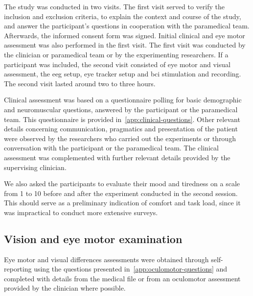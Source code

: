 \documentclass{article}
\begin{document}
The study was conducted in two visits.
The first visit served to verify the inclusion and
exclusion criteria, to explain the context and course of the study, and answer
the participant's questions in cooperation with the paramedical team.
Afterwards, the informed consent form was signed.
Initial clinical and eye motor assessment was also performed in the first visit.
The first visit was conducted by the clinician or paramedical team or by the
experimenting researchers.
If a participant was included, the second visit consisted of  eye motor and
visual assessment, the \ac{eeg} setup, eye tracker setup and
\ac{bci} stimulation and recording.
The second visit lasted around two to three hours.

Clinical assessment was based on a questionnaire polling for basic demographic
and neuromuscular questions, answered by the participant or the paramedical team.
This questionnaire is provided in~\cref{app:clinical-questions}.
Other relevant details concerning communication, pragmatics and presentation of the patient
were observed by the researchers who carried out the experiments or through
conversation with the participant or the paramedical team.
The clinical assessment was complemented with further relevant details provided
by the supervising clinician.

We also asked the participants to evaluate their mood and tiredness on a scale
from 1 to 10 before and
after the experiment conducted in the second session.
This should serve as a preliminary indication of comfort and task load,
since it was impractical to conduct more extensive surveys.


\subsection{Vision and eye motor examination}

Eye motor and visual differences assessments were obtained through self-reporting using the questions
presented in~\cref{app:oculomotor-questions} and completed with details from the
medical file or from an oculomotor assessment provided by the clinician where possible.
\end{document}
